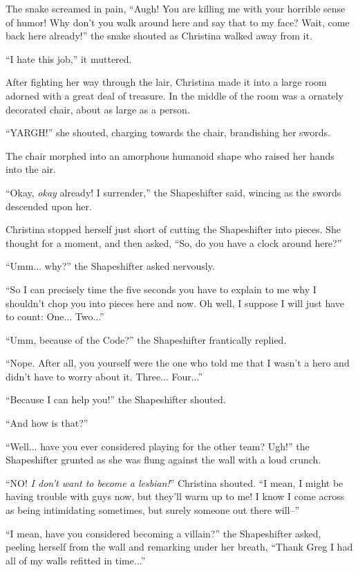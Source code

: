 \documentclass[showtrims,b6paper,draft,10pt]{memoir}
\begin{document}
The snake screamed in pain,  ``Augh!  You are killing me with your horrible sense of humor!  Why don't you walk around here and say that to my face?  Wait, come back here already!''  the snake shouted as Christina walked away from it.

``I hate this job,'' it muttered.

\timeskip
After fighting her way through the lair, Christina made it into a large room adorned with a great deal of treasure.  In the middle of the room was a ornately decorated chair, about as large as a person.

``YARGH!'' she shouted, charging towards the chair, brandishing her swords.

The chair morphed into an amorphous humanoid shape who raised her hands into the air.

``Okay, \emph{okay} already!  I surrender,'' the Shapeshifter said, wincing as the swords descended upon her.

Christina stopped herself just short of cutting the Shapeshifter into pieces.  She thought for a moment, and then asked, ``So, do you have a clock around here?''

``Umm... why?'' the Shapeshifter asked nervously.

``So I can precisely time the five seconds you have to explain to me why I shouldn't chop you into pieces here and now.  Oh well, I suppose I will just have to count:  One... Two...''

``Umm, because of the Code?''  the Shapeshifter frantically replied.

``Nope.  After all, you yourself were the one who told me that I wasn't a hero and didn't have to worry about it.  Three... Four...''

``Because I can help you!''  the Shapeshifter shouted.

``And how is that?''

``Well... have you ever considered playing for the other team?  Ugh!'' the Shapeshifter grunted as she was flung against the wall with a loud crunch.

``NO!  \emph{I don't want to become a lesbian!}''  Christina shouted.  ``I mean, I might be having trouble with guys now, but they'll warm up to me!  I know I come across as being intimidating sometimes, but surely someone out there will--''

``I mean, have you considered becoming a villain?''  the Shapeshifter asked, peeling herself from the wall and remarking under her breath, ``Thank Greg I had all of my walls refitted in time...''
\end{document}
